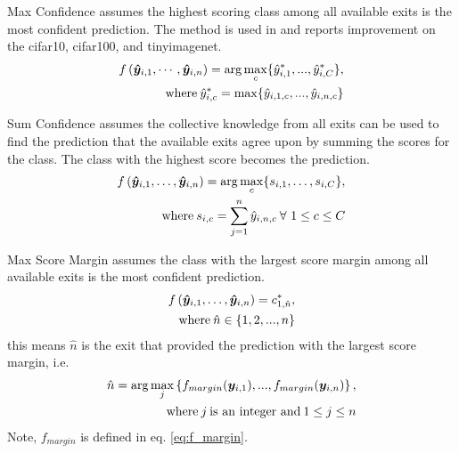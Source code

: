 \begin{enumdescript}
\begin{enumdescript}
		\item[Max Confidence] assumes the highest scoring class among all available exits is the most confident prediction. The method is used in \cite{kaya_shallow-deep_nodate} and reports improvement on the \gls{cifar10}, \gls{cifar100}, and \gls{tinyimagenet}. 
		\begin{align}
		\begin{split}
		f\left(\bm{\hat{y}}_{i,1}, \cdots, \bm{\hat{y}}_{i,n} \right) =  \arg \underset{c}{\max} \{\hat{y}^*_{i,1}, ..., \hat{y}^*_{i,C} \},
		\\ \text{where\:} \hat{y}^*_{i,c} = \max \{\hat{y}_{i,1,c}, ..., \hat{y}_{i,n,c}\}
		\end{split}	
		\end{align}
		\item[Sum Confidence] assumes the collective knowledge from all exits can be used to find the prediction that the available exits agree upon by summing the scores for the class. The class with the highest score becomes the prediction.
		\begin{align}
		\begin{split}
		f\left(\bm{\hat{y}}_{i,1}, \dots, \bm{\hat{y}}_{i,n} \right) = \arg \underset{c}{\max} \{s_{i,1}, \dots, s_{i,C}\}, \\ \text{where\:} s_{i,c} = \sum_{j=1}^{n}\hat{y}_{i,n,c}\: \forall \ 1\le c \le C
		\end{split}
		\end{align}			
		\item[Max Score Margin] assumes the class with the largest score margin among all available exits is the most confident prediction. 			\begin{align}
		\begin{split}
		f\left(\bm{\hat{y}}_{i,1}, \dots, \bm{\hat{y}}_{i,n} \right) =c^*_{1,\hat{n}},\\
		\text{where\:} \hat{n} \in \{1, 2, ..., n\}
		\end{split}	
		\end{align}
		this means $ \hat{n} $ is the exit that provided the prediction with the largest score margin, i.e.
		\begin{align*}
		\begin{split}
		\hat{n} = \arg \underset{j}{\max} \left\{f_{margin}(\bm{y}_{i,1}), ..., f_{margin}(\bm{y}_{i,n})\right\} ,\\
		\text{where\:} j \text{\:is an integer and\:} 1 \le j \le n
		\end{split}
		\end{align*}
		Note, $ f_{margin} $ is defined in eq. \ref{eq:f_margin}.
	\end{enumdescript}
	

\end{enumdescript}
